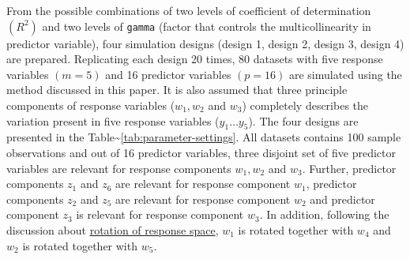 \documentclass[12pt,A4paper,authoryear]{elsarticle} %
\theoremstyle{definition}
\theoremstyle{definition}
\theoremstyle{remark}
\begin{document}
From the possible combinations of two levels of coefficient of
determination \((R^2)\) and two levels of \texttt{gamma} (factor that
controls the multicollinearity in predictor variable), four simulation
designs (design 1, design 2, design 3, design 4) are prepared.
Replicating each design 20 times, 80 datasets with five response
variables \((m=5)\) and 16 predictor variables \((p = 16)\) are
simulated using the method discussed in this paper. It is also assumed
that three principle components of response variables (\(w_1, w_2\) and
\(w_3\)) completely describes the variation present in five response
variables (\(y_1 \ldots y_5\)). The four designs are presented in the
Table\textasciitilde{}\ref{tab:parameter-settings}. All datasets
contains 100 sample observations and out of 16 predictor variables,
three disjoint set of five predictor variables are relevant for response
components \(w_1, w_2\) and \(w_3\). Further, predictor components
\(z_1\) and \(z_6\) are relevant for response component \(w_1\),
predictor components \(z_2\) and \(z_5\) are relevant for response
component \(w_2\) and predictor component \(z_3\) is relevant for
response component \(w_3\). In addition, following the discussion about
\protect\hyperlink{rotation-of-response-space}{rotation of response
space}, \(w_1\) is rotated together with \(w_4\) and \(w_2\) is rotated
together with \(w_5\).
\end{document}
